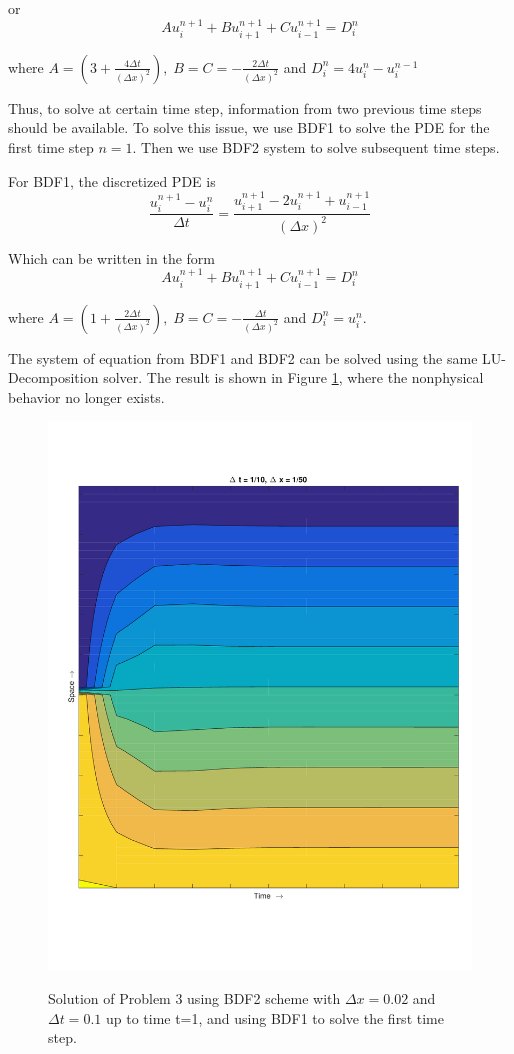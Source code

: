 or
$$
Au_{i}^{n+1} + Bu_{i+1}^{n+1} +Cu_{i-1}^{n+1} = D_{i}^{n}
$$
\vspace{0.2mm}

where $A = (3+\frac{4\Delta t}{(\Delta x)^{2}}), \; B=C=- \frac{2\Delta t}{(\Delta x)^2}$ and $D_{i}^{n}=4u_{i}^{n} - u_{i}^{n-1}$

Thus, to solve at certain time step, information from two previous time steps should be available. To solve this issue, we use BDF1 to solve the PDE for the first time step $n=1$. Then we use BDF2 system to solve subsequent time steps.

For BDF1, the discretized PDE is
$$
\frac{u_{i}^{n+1}-u_{i}^{n}}{\Delta t} = \frac{u_{i+1}^{n+1} -2u_{i}^{n+1}+u_{i-1}^{n+1}}{(\Delta x)^{2}}
$$

Which can be written in the form 
$$
Au_{i}^{n+1} + Bu_{i+1}^{n+1} +Cu_{i-1}^{n+1} = D_{i}^{n}
$$


where $A = (1+\frac{2\Delta t}{(\Delta x)^{2}}), \; B=C=- \frac{\Delta t}{(\Delta x)^2}$ and $D_{i}^{n}=u_{i}^{n}$.

The system of equation from BDF1 and BDF2 can be solved using the same LU-Decomposition solver. The result is shown in Figure \ref{fig:bdf2}, where the nonphysical behavior no longer exists. 

 \begin{figure}[!tbh]
 \centering  
  {\includegraphics[scale=0.4]{fig/X10_T50_BFD2.pdf}}  
  \caption{Solution of Problem 3 using BDF2 scheme with $\Delta x=0.02$ and $\Delta t=0.1$ up to time t=1, and using BDF1 to solve the first time step.}
   \label{fig:bdf2}
\end{figure} 

